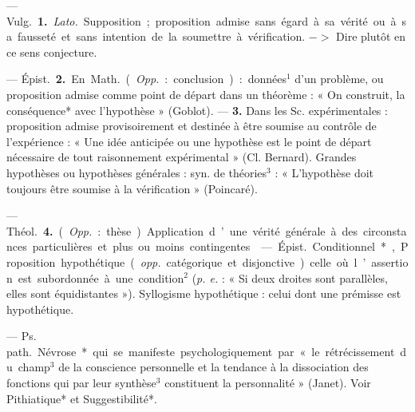 \begin{itemize}[leftmargin=1cm, label=, itemsep=1pt]
 — \si{Vulg.} {\bf 1.} {\it Lato.} Supposition ; proposition admise sans
égard à sa vérité ou à sa fausseté et
sans intention de la soumettre à
vérification. $->$ Dire plutôt en ce
sens conjecture.

— \si{Épist.} {\bf 2.} En \si{Math.} ({\it Opp.} : conclusion) : données$^1$ d’un problème,
ou proposition admise comme point
de départ dans un théorème : « On
construit, la conséquence* avec
l'hypothèse » (Goblot). — {\bf 3.} Dans
les Sc. expérimentales : proposition
admise provisoirement et destinée
à être soumise au contrôle de l’expérience : « Une idée anticipée ou une
hypothèse est le point de départ
nécessaire de tout raisonnement
expérimental » (Cl. Bernard). Grandes hypothèses ou hypothèses générales : syn. de théories$^3$ : « L’hypothèse doit toujours être soumise à la
vérification » (Poincaré).

— \si{Théol.} {\bf 4.} ({\it Opp.} : thèse). Application d’une vérité générale à des
circonstances particulières et plus
ou moins contingentes.

 — \si{Épist.} Conditionnel*,
Proposition hypothétique ({\it opp.} catégorique et disjonctive) celle où
l’assertion est subordonnée à une
condition$^2$ ({\it p. e.} : « Si deux droites sont
parallèles, elles sont équidistantes »).
Syllogisme hypothétique : celui dont
une prémisse est hypothétique.

 — \si{Ps. path.} Névrose* qui
se manifeste psychologiquement par
« le rétrécissement du champ$^3$ de la
conscience personnelle et la tendance à la dissociation des fonctions qui par leur synthèse$^3$ constituent la personnalité » (Janet). Voir
Pithiatique* et Suggestibilité*.

	\end{itemize}
